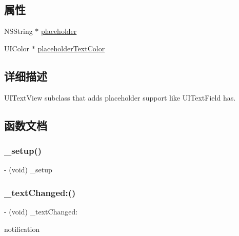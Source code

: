 \subsection*{属性}
\begin{DoxyCompactItemize}
\item 
N\+S\+String $\ast$ \hyperlink{interface_m_a_r_u_i_text_view_a245315d2f5b22ec8e0ea414a5455021c}{placeholder}
\item 
U\+I\+Color $\ast$ \hyperlink{interface_m_a_r_u_i_text_view_a53edbf7ad4e03c3f9de44712c8c2ccf8}{placeholder\+Text\+Color}
\end{DoxyCompactItemize}


\subsection{详细描述}
U\+I\+Text\+View subclass that adds placeholder support like U\+I\+Text\+Field has. 

\subsection{函数文档}
\mbox{\label{interface_m_a_r_u_i_text_view_ab776d800a2938d34c31b7b6a3e13e563}} 
\subsubsection{\texorpdfstring{\+\_\+setup()}{\_setup()}}
{\footnotesize\ttfamily -\/ (void) \+\_\+setup \begin{DoxyParamCaption}{ }\end{DoxyParamCaption}\hspace{0.3cm}{\ttfamily [implementation]}}

\mbox{\label{interface_m_a_r_u_i_text_view_ab43f82db634ee534df0a2b8c87d66944}} 
\subsubsection{\texorpdfstring{\+\_\+text\+Changed\+:()}{\_textChanged:()}}
{\footnotesize\ttfamily -\/ (void) \+\_\+text\+Changed\+: \begin{DoxyParamCaption}\item[{(N\+S\+Notification $\ast$)}]{notification }\end{DoxyParamCaption}\hspace{0.3cm}{\ttfamily [implementation]}}

